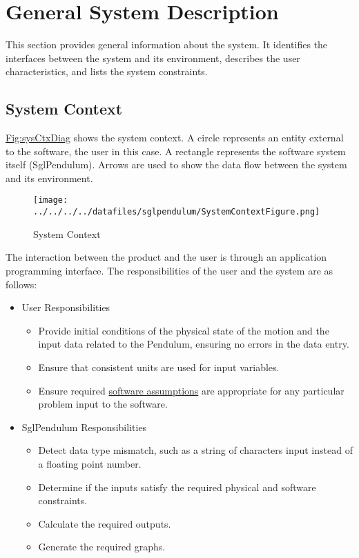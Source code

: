 \documentclass[12pt]{article}
\begin{document}
\section{General System Description}
\label{Sec:GenSysDesc}
This section provides general information about the system. It identifies the interfaces between the system and its environment, describes the user characteristics, and lists the system constraints.

\subsection{System Context}
\label{Sec:SysContext}
\hyperref[Figure:sysCtxDiag]{Fig:sysCtxDiag} shows the system context. A circle represents an entity external to the software, the user in this case. A rectangle represents the software system itself (SglPendulum). Arrows are used to show the data flow between the system and its environment.

\begin{figure}
\begin{center}
\texttt{[image: ../../../../datafiles/sglpendulum/SystemContextFigure.png]}
\caption{System Context}
\label{Figure:sysCtxDiag}
\end{center}
\end{figure}
The interaction between the product and the user is through an application programming interface. The responsibilities of the user and the system are as follows:

\begin{itemize}
\item{User Responsibilities}
\begin{itemize}
\item{Provide initial conditions of the physical state of the motion and the input data related to the Pendulum, ensuring no errors in the data entry.}
\item{Ensure that consistent units are used for input variables.}
\item{Ensure required \hyperref[Sec:Assumps]{software assumptions} are appropriate for any particular problem input to the software.}
\end{itemize}
\item{SglPendulum Responsibilities}
\begin{itemize}
\item{Detect data type mismatch, such as a string of characters input instead of a floating point number.}
\item{Determine if the inputs satisfy the required physical and software constraints.}
\item{Calculate the required outputs.}
\item{Generate the required graphs.}
\end{itemize}
\end{itemize}
\end{document}
